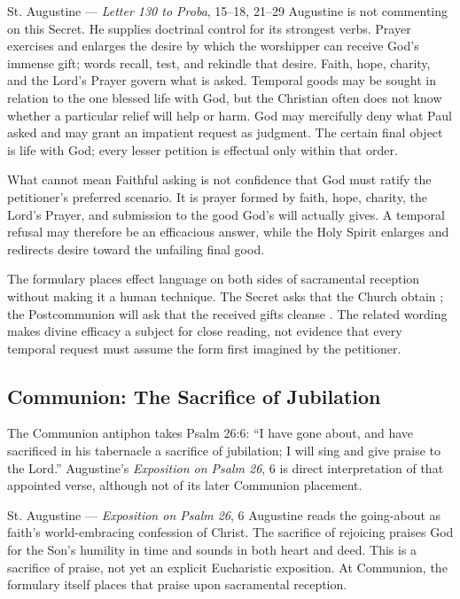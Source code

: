 \begin{deepstudy}
\begin{sourcecard}{St. Augustine --- \emph{Letter 130 to Proba}, 15--18, 21--29}
Augustine is not commenting on this Secret. He supplies doctrinal control for its strongest verbs. Prayer exercises and enlarges the desire by which the worshipper can receive God's immense gift; words recall, test, and rekindle that desire. Faith, hope, charity, and the Lord's Prayer govern what is asked. Temporal goods may be sought in relation to the one blessed life with God, but the Christian often does not know whether a particular relief will help or harm. God may mercifully deny what Paul asked and may grant an impatient request as judgment. The certain final object is life with God; every lesser petition is effectual only within that order.
\end{sourcecard}

\begin{studybox}{What  cannot mean}
Faithful asking is not confidence that God must ratify the petitioner's preferred scenario. It is prayer formed by faith, hope, charity, the Lord's Prayer, and submission to the good God's will actually gives. A temporal refusal may therefore be an efficacious answer, while the Holy Spirit enlarges and redirects desire toward the unfailing final good.
\end{studybox}

The formulary places effect language on both sides of sacramental reception without making it a human technique. The Secret asks that the Church obtain ; the Postcommunion will ask that the received gifts cleanse . The related wording makes divine efficacy a subject for close reading, not evidence that every temporal request must assume the form first imagined by the petitioner.

\sectionguard
\subsection*{Communion: The Sacrifice of Jubilation\enspace{}}

The Communion antiphon takes Psalm 26:6: ``I have gone about, and have sacrificed in his tabernacle a sacrifice of jubilation; I will sing and give praise to the Lord.'' Augustine's \emph{Exposition on Psalm 26}, 6 is direct interpretation of that appointed verse, although not of its later Communion placement.

\begin{sourcecard}{St. Augustine --- \emph{Exposition on Psalm 26}, 6}
Augustine reads the going-about as faith's world-embracing confession of Christ. The sacrifice of rejoicing praises God for the Son's humility in time and sounds in both heart and deed. This is a sacrifice of praise, not yet an explicit Eucharistic exposition. At Communion, the formulary itself places that praise upon sacramental reception.
\end{sourcecard}


\end{deepstudy}
